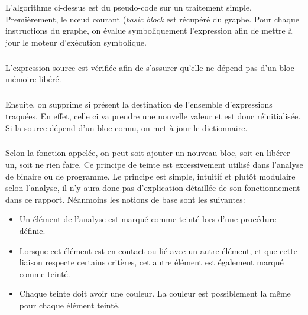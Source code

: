 L'algorithme ci-dessus est du pseudo-code sur un traitement simple.
Premièrement, le nœud courant (\textit{basic block} est récupéré du graphe. Pour chaque instructions du graphe, on évalue symboliquement
l'expression afin de mettre à jour le moteur d'exécution symbolique.
\subparagraph{}
L'expression source est vérifiée afin de s'assurer qu'elle ne dépend pas d'un bloc mémoire libéré.
\subparagraph{}
Ensuite, on supprime si présent la destination de l'ensemble d'expressions traquées. En effet, celle ci va prendre une nouvelle valeur et est donc
réinitialisée. Si la source dépend d'un bloc connu, on met à jour le dictionnaire.
\subparagraph{}
Selon la fonction appelée, on peut soit ajouter un nouveau bloc, soit en libérer un, soit ne rien faire.
Ce principe de teinte est excessivement utilisé dans l'analyse de binaire ou de programme. Le principe est simple, intuitif et plutôt modulaire selon l'analyse, il n'y aura
donc pas d'explication détaillée de son fonctionnement dans ce rapport. Néanmoins les notions de base sont les suivantes:
\begin{itemize}
        \item Un élément de l'analyse est marqué comme teinté lors d'une procédure définie.
        \item Lorsque cet élément est en contact ou lié avec un autre élément, et que cette liaison respecte certains
            critères, cet autre élément est également marqué comme teinté.
        \item Chaque teinte doit avoir une couleur. La couleur est possiblement la même pour chaque élément teinté.
\end{itemize}

